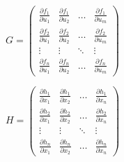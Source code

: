 \documentclass{jarticle}
\begin{document}
\[
  G = \left(
    \begin{array}{cccc}
      \frac{\partial f_{1}}{\partial u_{1}} & \frac{\partial f_{1}}{\partial u_{2}} & \ldots & \frac{\partial f_{1}}{\partial u_{m}} \\
      \frac{\partial f_{2}}{\partial u_{1}} & \frac{\partial f_{2}}{\partial u_{2}} & \ldots & \frac{\partial f_{2}}{\partial u_{m}} \\
      \vdots & \vdots & \ddots & \vdots \\
      \frac{\partial f_{n}}{\partial u_{1}} & \frac{\partial f_{n}}{\partial u_{2}} & \ldots & \frac{\partial f_{n}}{\partial u_{m}}
    \end{array}
  \right)
\]

\[
  H = \left(
    \begin{array}{cccc}
      \frac{\partial h_{1}}{\partial x_{1}} & \frac{\partial h_{1}}{\partial x_{2}} & \ldots & \frac{\partial h_{1}}{\partial x_{n}} \\
      \frac{\partial h_{2}}{\partial x_{1}} & \frac{\partial h_{2}}{\partial x_{2}} & \ldots & \frac{\partial h_{2}}{\partial x_{n}} \\
      \vdots & \vdots & \ddots & \vdots \\
      \frac{\partial h_{n}}{\partial x_{1}} & \frac{\partial h_{n}}{\partial x_{2}} & \ldots & \frac{\partial h_{n}}{\partial x_{n}}
    \end{array}
  \right)
\]
\end{document}
